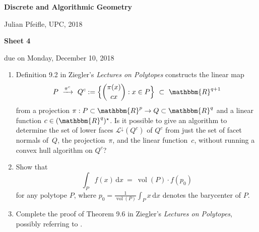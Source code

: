 \documentclass[11pt]{amsart}
\DeclareMathOperator{\vol}{vol}
\newcommand{\RR}{\mathbbm{R}}
\begin{document}
\begin{center}
\textbf{\sffamily
   Discrete and Algorithmic Geometry }

\medskip
   Julian Pfeifle,
   UPC, 2018
\end{center}


\begin{center}
  \textbf{\sffamily Sheet 4}

\bigskip
 due on Monday, December 10, 2018

\end{center}

\bigskip
\bigskip
\bigskip

\begin{enumerate}
\item Definition 9.2 in Ziegler's \emph{Lectures on Polytopes} constructs the linear map
  \[
    P
    \ \xrightarrow{\pi^c}\ 
    Q^c :=
    \Big\{ \binom{\pi(x)}{cx} : x\in P\Big\}
    \ \subset \
    \RR^{q+1}
  \]
  from a projection $\pi:P\subset\RR^p\to Q\subset\RR^q$ and a linear function $c\in(\RR^q)^\star$.
  Is it possible to give an algorithm to determine the set of lower faces $\mathcal L^\downarrow(Q^c)$ of $Q^c$ from just the set of facet normals of~$Q$, the projection~$\pi$, and the linear function~$c$, without running a convex hull algorithm on $Q^c$?

  \bigskip\bigskip
\item Show that
  \[
    \int_P f(x)\,\text{d}x
    \ = \
    \vol(P) \cdot f(p_0)
  \]
  for any polytope $P$, where $p_0 = \frac{1}{\vol(P)}\int_P x\,\text{d}x$ denotes the barycenter of $P$.
  \bigskip\bigskip
\item Complete the proof of Theorem 9.6 in Ziegler's \emph{Lectures on Polytopes}, possibly referring to \cite{bs-1992}.
  
\end{enumerate}



\end{document}
